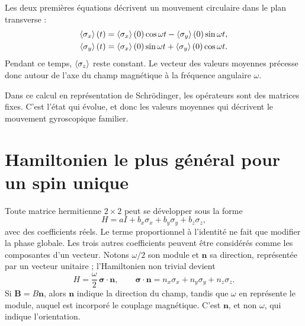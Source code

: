 Les deux premières équations décrivent un mouvement circulaire dans le plan transverse :
\begin{align}
\left\langle\sigma_x\right\rangle(t)
&=\left\langle\sigma_x\right\rangle(0)\cos\omega t
-\left\langle\sigma_y\right\rangle(0)\sin\omega t,\\
\left\langle\sigma_y\right\rangle(t)
&=\left\langle\sigma_x\right\rangle(0)\sin\omega t
+\left\langle\sigma_y\right\rangle(0)\cos\omega t.
\end{align}
Pendant ce temps, \(\left\langle\sigma_z\right\rangle\) reste constant. Le vecteur des valeurs moyennes précesse donc autour de l’axe du champ magnétique à la fréquence angulaire \(\omega\).

Dans ce calcul en représentation de Schr\"odinger, les opérateurs sont des matrices fixes. C’est l’état qui évolue, et donc les valeurs moyennes qui décrivent le mouvement gyroscopique familier.

\begin{classroomqa}\end{classroomqa}

\section{Hamiltonien le plus général pour un spin unique}

Toute matrice hermitienne \(2\times2\) peut se développer sous la forme
\begin{equation}
H=aI+b_x\sigma_x+b_y\sigma_y+b_z\sigma_z,
\end{equation}
avec des coefficients réels. Le terme proportionnel à l’identité ne fait que modifier la phase globale. Les trois autres coefficients peuvent être considérés comme les composantes d’un vecteur. Notons \(\omega/2\) son module et \(\bm n\) sa direction, représentée par un vecteur unitaire ; l’Hamiltonien non trivial devient
\begin{equation}
H=\frac{\omega}{2}\,\bm\sigma\cdot\bm n,
\qquad
\bm\sigma\cdot\bm n
=n_x\sigma_x+n_y\sigma_y+n_z\sigma_z.
\label{eq:l5-general-spin-h}
\end{equation}
Si \(\bm B=B\bm n\), alors \(\bm n\) indique la direction du champ, tandis que \(\omega\) en représente le module, auquel est incorporé le couplage magnétique. C’est \(\bm n\), et non \(\omega\), qui indique l’orientation.

